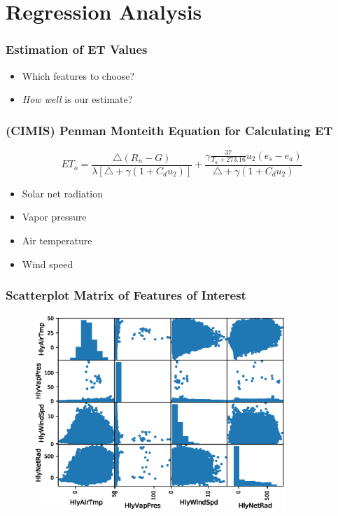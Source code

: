 \section{Regression Analysis}
\begin{frame}
\frametitle{Estimation of ET Values}
\begin{itemize}
\setlength\itemsep{1em}
\item Which features to choose?
\item \textit{How well} is our estimate?
\end{itemize}
\end{frame}

\begin{frame}
\frametitle{(CIMIS) Penman Monteith Equation for Calculating ET}
\begin{equation*}
\boxed{ET_o = \frac{\bigtriangleup(R_n-G)}{\lambda[\bigtriangleup+\gamma(1+C_du_2)]} + \frac{\gamma\frac{37}{T_a+273.16}u_2(e_s-e_a)}{\bigtriangleup+\gamma(1+C_du_2)}}
\end{equation*}
\begin{itemize}
\setlength\itemsep{1em}
\item Solar net radiation
\item Vapor pressure
\item Air temperature
\item Wind speed
\end{itemize}
\end{frame}

\begin{frame}
\frametitle{Scatterplot Matrix of Features of Interest}
\begin{figure}
\includegraphics[width=0.85\textwidth]{images/scatterplot-matrix-HlyAirTmp-HlyVapPres-HlyWindSpd-HlyNetRad}
\end{figure}
\end{frame}

